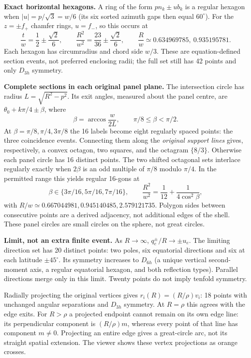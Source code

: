 \documentclass[10pt,a4paper]{article}
\newcommand{\head}[1]{\vspace{4pt}{\large\bfseries\color{ink}#1}\par}
\newcommand{\smallhead}[1]{\textbf{#1}\quad}
\begin{document}
\smallhead{Exact horizontal hexagons.}
A ring of the form $p n_k\pm u b_k$ is a regular hexagon when
$|u|=p/\sqrt3=w/6$ (its six sorted azimuth gaps then equal $60^\circ$).
For the $z=\pm f_+$ chamfer rings, $u=f_-$, so this occurs at
\[
 \frac{t}{w}=\frac12\pm\frac{\sqrt2}{6},\qquad
 \frac{R^2}{w^2}=\frac{23}{36}\pm\frac{\sqrt2}{6},\qquad
 \frac{R}{w}\simeq0.634969785,\ 0.935195781.
\]
Each hexagon has circumradius and chord side $w/3$. These are equation-defined
section events, not preferred enclosing radii; the full set still has 42 points
and only $D_{3h}$ symmetry.

\smallhead{Complete sections in each original panel plane.}
The intersection circle has radius $L=\sqrt{R^2-p^2}$. Its exit angles, measured
about the panel centre, are $\theta_0+k\pi/4\pm\beta$, where
\[
 \beta=\arccos\frac{w}{2L},\qquad \pi/8\leq\beta<\pi/2.
\]
At $\beta=\pi/8,\pi/4,3\pi/8$ the 16 labels become eight regularly spaced points:
the three coincidence events. Connecting them along the \emph{original support lines}
gives, respectively, a convex octagon, two squares, and the octagram $\{8/3\}$.
Otherwise each panel circle has 16 distinct points. The two shifted octagonal sets
interlace regularly exactly when $2\beta$ is an odd multiple of $\pi/8$ modulo $\pi/4$.
In the permitted range this yields regular 16-gons at
\[
 \beta\in\{3\pi/16,5\pi/16,7\pi/16\},\qquad
 \frac{R^2}{w^2}=\frac1{12}+\frac1{4\cos^2\beta},
\]
with $R/w\simeq0.667044981,0.945140485,2.579121735$. Polygon sides between consecutive
points are a derived adjacency, not additional edges of the shell. These panel
circles are small circles on the sphere, not great circles.

\smallhead{Limit, not an extra finite event.}
As $R\to\infty$, $q_e^\pm/R\to\pm u_e$. The limiting direction set has 20 distinct
points: two poles, six equatorial directions and six at each latitude $\pm45^\circ$.
Its symmetry increases to $D_{6h}$ (a unique vertical second-moment axis, a regular
equatorial hexagon, and both reflection types). Parallel directions merge only
in this limit. Twenty points do not imply tenfold symmetry.

\head{6. Radial comparison and limits of interpretation}
Radially projecting the original vertices gives $r_i(R)=(R/\rho)v_i$: 18 points with
unchanged angular separations and $D_{3h}$ symmetry. At $R=\rho$ this agrees with the
edge exits. For $R>\rho$ a projected endpoint cannot remain on its own edge line:
its perpendicular component is $(R/\rho)m$, whereas every point of that line has
component $m\ne0$. Projecting an entire edge gives a great-circle arc, not its
straight spatial extension. The viewer shows these vertex projections as orange crosses.
\end{document}
